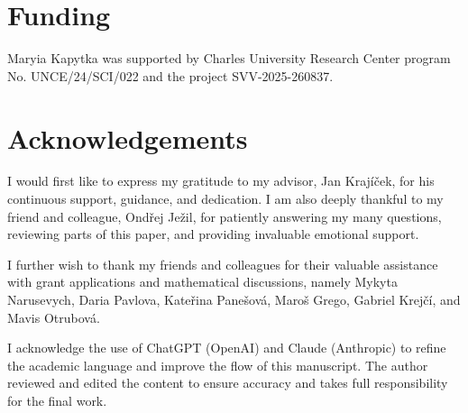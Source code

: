 \documentclass{article}
\theoremstyle{plain}
\theoremstyle{definition}
\begin{document}
\section*{Funding}

Maryia Kapytka was supported by Charles University Research Center program No. UNCE/24/SCI/022 and the project SVV-2025-260837.

\section*{Acknowledgements}

I would first like to express my gratitude to my advisor, Jan Krajíček, for his continuous support, guidance, and dedication. I am also deeply thankful to my friend and colleague, Ondřej Ježil, for patiently answering my many questions, reviewing parts of this paper, and providing invaluable emotional support.

I further wish to thank my friends and colleagues for their valuable assistance with grant applications and mathematical discussions, namely  Mykyta Narusevych, Daria Pavlova, Kateřina Panešová, Maroš Grego, Gabriel Krejčí, and Mavis Otrubová.

I acknowledge the use of ChatGPT (OpenAI) and Claude (Anthropic) to refine the academic language and improve the flow of this manuscript. The author reviewed and edited the content to ensure accuracy and takes full responsibility for the final work.



\end{document}
